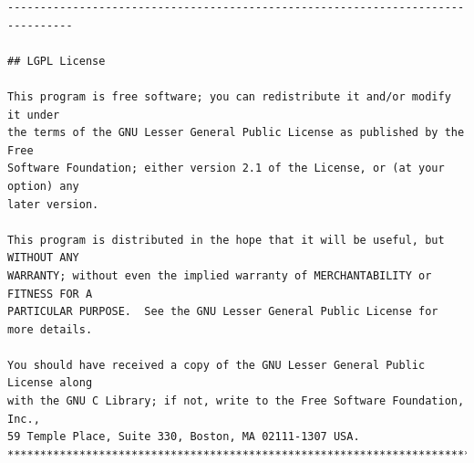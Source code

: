 \documentclass{article}
\begin{document}
\begin{lstlisting}[caption=\texttt{filters.lib}]
--------------------------------------------------------------------------------

## LGPL License

This program is free software; you can redistribute it and/or modify it under 
the terms of the GNU Lesser General Public License as published by the Free 
Software Foundation; either version 2.1 of the License, or (at your option) any 
later version.

This program is distributed in the hope that it will be useful, but WITHOUT ANY 
WARRANTY; without even the implied warranty of MERCHANTABILITY or FITNESS FOR A 
PARTICULAR PURPOSE.  See the GNU Lesser General Public License for more details.

You should have received a copy of the GNU Lesser General Public License along 
with the GNU C Library; if not, write to the Free Software Foundation, Inc., 
59 Temple Place, Suite 330, Boston, MA 02111-1307 USA.
*******************************************************************************/
\end{lstlisting}
\end{document}

